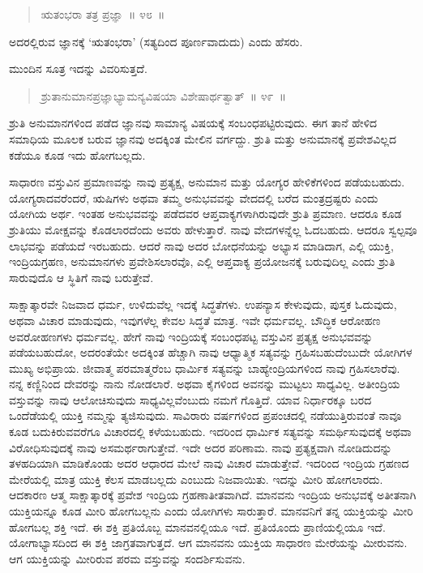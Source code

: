 \begin{verse}
ಋತಂಭರಾ ತತ್ರ ಪ್ರಜ್ಞಾ~॥ ೪೮~॥
\end{verse}

\vspace{-0.3cm}

ಅದರಲ್ಲಿರುವ ಜ್ಞಾನಕ್ಕೆ ‘ಋತಂಭರಾ’ (ಸತ್ಯದಿಂದ ಪೂರ್ಣವಾದುದು) ಎಂದು ಹೆಸರು. 

ಮುಂದಿನ ಸೂತ್ರ ಇದನ್ನು ವಿವರಿಸುತ್ತದೆ. 

\vspace{-0.3cm}

\begin{verse}
ಶ್ರುತಾನುಮಾನಪ್ರಜ್ಞಾಭ್ಯಾಮನ್ಯವಿಷಯಾ ವಿಶೇಷಾರ್ಥತ್ವಾತ್​~॥ ೪೯~॥
\end{verse}

\vspace{-0.3cm}

ಶ್ರುತಿ ಅನುಮಾನಗಳಿಂದ ಪಡೆದ ಜ್ಞಾನವು ಸಾಮಾನ್ಯ ವಿಷಯಕ್ಕೆ ಸಂಬಂಧಪಟ್ಟಿರುವುದು. ಈಗ ತಾನೆ ಹೇಳಿದ ಸಮಾಧಿಯ ಮೂಲಕ ಬರುವ ಜ್ಞಾನವು ಅದಕ್ಕಿಂತ ಮೇಲಿನ ವರ್ಗದ್ದು. ಶ್ರುತಿ ಮತ್ತು ಅನುಮಾನಕ್ಕೆ ಪ್ರವೇಶವಿಲ್ಲದ ಕಡೆಯೂ ಕೂಡ ಇದು ಹೋಗಬಲ್ಲದು. 

ಸಾಧಾರಣ ವಸ್ತುವಿನ ಪ್ರಮಾಣವನ್ನು ನಾವು ಪ್ರತ್ಯಕ್ಷ, ಅನುಮಾನ ಮತ್ತು ಯೋಗ್ಯರ ಹೇಳಿಕೆಗಳಿಂದ ಪಡೆಯಬಹುದು. ಯೋಗ್ಯರಾದವರೆಂದರೆ, ಋಷಿಗಳು ಅಥವಾ ತಮ್ಮ ಅನುಭವವನ್ನು ವೇದದಲ್ಲಿ ಬರೆದ ಮಂತ್ರದ್ರಷ್ಟರು ಎಂದು ಯೋಗಿಯ ಅರ್ಥ. ಇಂತಹ ಅನುಭವವನ್ನು ಪಡೆದವರ ಆಪ್ತವಾಕ್ಯಗಳಾಗಿರುವುದೇ ಶ್ರುತಿ ಪ್ರಮಾಣ. ಆದರೂ ಕೂಡ ಶ್ರುತಿಯು ಮೋಕ್ಷವನ್ನು ಕೊಡಲಾರದೆಂದು ಅವರು ಹೇಳುತ್ತಾರೆ. ನಾವು ವೇದಗಳನ್ನೆಲ್ಲ ಓದಬಹುದು. ಆದರೂ ಸ್ವಲ್ಪವೂ ಲಾಭವನ್ನು ಪಡೆಯದೆ ಇರಬಹುದು. ಆದರೆ ನಾವು ಅದರ ಬೋಧನೆಯನ್ನು ಅಭ್ಯಾಸ ಮಾಡಿದಾಗ, ಎಲ್ಲಿ ಯುಕ್ತಿ, ಇಂದ್ರಿಯಗ್ರಹಣ, ಅನುಮಾನಗಳು ಪ್ರವೇಶಿಸಲಾರವೊ, ಎಲ್ಲಿ ಆಪ್ತವಾಕ್ಯ ಪ್ರಯೋಜನಕ್ಕೆ ಬರುವುದಿಲ್ಲ ಎಂದು ಶ್ರುತಿ ಸಾರುವುದೊ ಆ ಸ್ಥಿತಿಗೆ ನಾವು ಬರುತ್ತೇವೆ. 

ಸಾಕ್ಷಾತ್ಕಾರವೇ ನಿಜವಾದ ಧರ್ಮ, ಉಳಿದುವೆಲ್ಲ ಇದಕ್ಕೆ ಸಿದ್ಧತೆಗಳು. ಉಪನ್ಯಾಸ ಕೇಳುವುದು, ಪುಸ್ತಕ ಓದುವುದು, ಅಥವಾ ವಿಚಾರ ಮಾಡುವುದು, ಇವುಗಳೆಲ್ಲ ಕೇವಲ ಸಿದ್ಧತೆ ಮಾತ್ರ. ಇವೇ ಧರ್ಮವಲ್ಲ. ಬೌದ್ಧಿಕ ಆರೋಹಣ ಅವರೋಹಣಗಳು ಧರ್ಮವಲ್ಲ. ಹೇಗೆ ನಾವು ಇಂದ್ರಿಯಕ್ಕೆ ಸಂಬಂಧಪಟ್ಟ ವಸ್ತುವಿನ ಪ್ರತ್ಯಕ್ಷ ಅನುಭವವನ್ನು ಪಡೆಯಬಹುದೋ, ಅದರಂತೆಯೇ ಅದಕ್ಕಿಂತ ಹೆಚ್ಚಾಗಿ ನಾವು ಆಧ್ಯಾತ್ಮಿಕ ಸತ್ಯವನ್ನು ಗ್ರಹಿಸಬಹುದೆಂಬುದೇ ಯೋಗಿಗಳ ಮುಖ್ಯ ಅಭಿಪ್ರಾಯ. ಜೀವಾತ್ಮ ಪರಮಾತ್ಮರೆಂಬ ಧಾರ್ಮಿಕ ಸತ್ಯವನ್ನು ಬಾಹ್ಯೇಂದ್ರಿಯಗಳಿಂದ ನಾವು ಗ್ರಹಿಸಲಾರೆವು. ನನ್ನ ಕಣ್ಣಿನಿಂದ ದೇವರನ್ನು ನಾನು ನೋಡಲಾರೆ. ಅಥವಾ ಕೈಗಳಿಂದ ಅವನನ್ನು ಮುಟ್ಟಲು ಸಾಧ್ಯವಿಲ್ಲ. ಅತೀಂದ್ರಿಯ ವಸ್ತುವನ್ನು ನಾವು ಆಲೋಚಿಸುವುದು ಸಾಧ್ಯವಿಲ್ಲವೆಂಬುದು ನಮಗೆ ಗೊತ್ತಿದೆ. ಯಾವ ನಿರ್ಧಾರಕ್ಕೂ ಬರದ ಒಂದೆಡೆಯಲ್ಲಿ ಯುಕ್ತಿ ನಮ್ಮನ್ನು ತ್ಯಜಿಸುವುದು. ಸಾವಿರಾರು ವರ್ಷಗಳಿಂದ ಪ್ರಪಂಚದಲ್ಲಿ ನಡೆಯುತ್ತಿರುವಂತೆ ನಾವೂ ಕೂಡ ಬದುಕಿರುವವರೆಗೂ ವಿಚಾರದಲ್ಲಿ ಕಳೆಯಬಹುದು. ಇದರಿಂದ ಧಾರ್ಮಿಕ ಸತ್ಯವನ್ನು ಸಮರ್ಥಿಸುವುದಕ್ಕೆ ಅಥವಾ ವಿರೋಧಿಸುವುದಕ್ಕೆ ನಾವು ಅಸಮರ್ಥರಾಗುತ್ತೇವೆ. ಇದೇ ಅದರ ಪರಿಣಾಮ. ನಾವು ಪ್ರತ್ಯಕ್ಷವಾಗಿ ನೋಡಿದುದನ್ನು ತಳಹದಿಯಾಗಿ ಮಾಡಿಕೊಂಡು ಅದರ ಆಧಾರದ ಮೇಲೆ ನಾವು ವಿಚಾರ ಮಾಡುತ್ತೇವೆ. ಇದರಿಂದ ಇಂದ್ರಿಯ ಗ್ರಹಣದ ಮೇರೆಯಲ್ಲಿ ಮಾತ್ರ ಯುಕ್ತಿ ಕೆಲಸ ಮಾಡಬಲ್ಲದು ಎಂಬುದು ನಿಜವಾಯಿತು. ಇದನ್ನು ಮೀರಿ ಹೋಗಲಾರದು. ಆದಕಾರಣ ಆತ್ಮ ಸಾಕ್ಷಾತ್ಕಾರಕ್ಕೆ ಪ್ರವೇಶ ಇಂದ್ರಿಯ ಗ್ರಹಣಾತೀತವಾಗಿದೆ. ಮಾನವನು ಇಂದ್ರಿಯ ಅನುಭವಕ್ಕೆ ಅತೀತನಾಗಿ ಯುಕ್ತಿಯನ್ನೂ ಕೂಡ ಮೀರಿ ಹೋಗಬಲ್ಲನು ಎಂದು ಯೋಗಿಗಳು ಸಾರುತ್ತಾರೆ. ಮಾನವನಿಗೆ ತನ್ನ ಯುಕ್ತಿಯನ್ನು ಮೀರಿ ಹೋಗಬಲ್ಲ ಶಕ್ತಿ ಇದೆ. ಈ ಶಕ್ತಿ ಪ್ರತಿಯೊಬ್ಬ ಮಾನವನಲ್ಲಿಯೂ ಇದೆ. ಪ್ರತಿಯೊಂದು ಪ್ರಾಣಿಯಲ್ಲಿಯೂ ಇದೆ. ಯೋಗಾಭ್ಯಾಸದಿಂದ ಈ ಶಕ್ತಿ ಜಾಗ್ರತವಾಗುತ್ತದೆ. ಆಗ ಮಾನವನು ಯುಕ್ತಿಯ ಸಾಧಾರಣ ಮೇರೆಯನ್ನು ಮೀರುವನು. ಆಗ ಯುಕ್ತಿಯನ್ನು ಮೀರಿರುವ ಪರಮ ವಸ್ತುವನ್ನು ಸಂದರ್ಶಿಸುವನು. 

